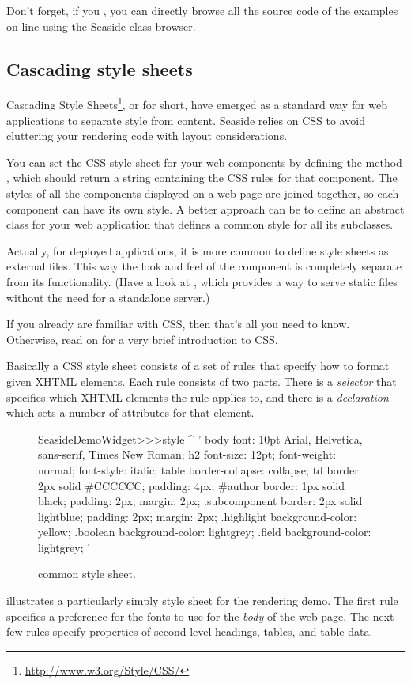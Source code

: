 \documentclass[a4paper,10pt,twoside]{book}
\begin{document}
Don't forget, if you , you can directly browse all the source code of the examples on line using the Seaside class browser.

\subsection{Cascading style sheets}
\label{sec:css}

Cascading Style Sheets\footnote{\url{http://www.w3.org/Style/CSS/}}, or  for short, have emerged as a standard way for web applications to separate style from content.
Seaside relies on CSS to avoid cluttering your rendering code with layout considerations.

You can set the CSS style sheet for your web components by defining the method , which should return a string containing the CSS rules for that component.
The styles of all the components displayed on a web page are joined together, so each component can have its own style.
A better approach can be to define an abstract class for your web application that defines a common style for all its subclasses.

Actually, for deployed applications, it is more common to define style sheets as external files.
This way the look and feel of the component is completely separate from its functionality.
(Have a look at , which provides a way to serve static files without the need for a standalone server.)

If you already are familiar with CSS, then that's all you need to know.
Otherwise, read on for a very brief introduction to CSS.

Basically a CSS style sheet consists of a set of rules that specify how to format given XHTML elements.
Each rule consists of two parts.
There is a \emph{selector} that specifies which XHTML elements the rule applies to, and there is a \emph{declaration} which sets a number of attributes for that element.

\begin{figure}[tb]
\begin{code}{}
SeasideDemoWidget>>>style
	^ '
body {
	font: 10pt Arial, Helvetica, sans-serif, Times New Roman;
}
h2 {
	font-size: 12pt;
	font-weight: normal;
	font-style: italic;
}
table { border-collapse: collapse; }
td {
	border: 2px solid #CCCCCC;
	padding: 4px;
}
#author {
	border: 1px solid black;
	padding: 2px;
	margin: 2px;
}
.subcomponent {
	border: 2px solid lightblue;
	padding: 2px;
	margin: 2px;
}
.highlight { background-color: yellow; }
.boolean { background-color: lightgrey; }
.field { background-color: lightgrey; }
'
\end{code}
\caption{ common style sheet.
\label{fig:democss}}
\end{figure}
 illustrates a particularly simply style sheet for the rendering demo.
The first rule specifies a preference for the fonts to use for the \emph{body} of the web page.
The next few rules specify properties of second-level headings, tables, and table data.
\end{document}
